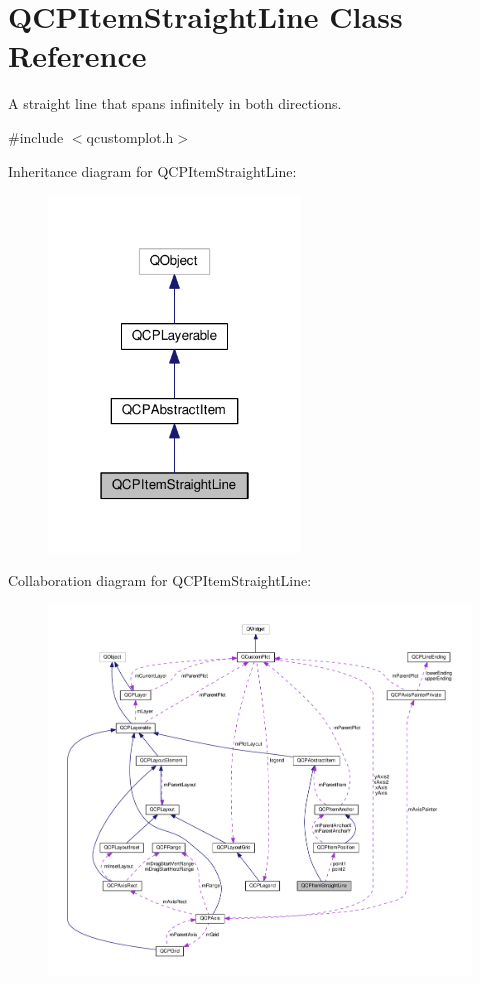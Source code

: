 \hypertarget{classQCPItemStraightLine}{}\section{Q\+C\+P\+Item\+Straight\+Line Class Reference}
\label{classQCPItemStraightLine}


A straight line that spans infinitely in both directions.  




{\ttfamily \#include $<$qcustomplot.\+h$>$}



Inheritance diagram for Q\+C\+P\+Item\+Straight\+Line\+:\nopagebreak
\begin{figure}[H]
\begin{center}
\leavevmode
\includegraphics[width=190pt]{classQCPItemStraightLine__inherit__graph}
\end{center}
\end{figure}


Collaboration diagram for Q\+C\+P\+Item\+Straight\+Line\+:\nopagebreak
\begin{figure}[H]
\begin{center}
\leavevmode
\includegraphics[width=350pt]{classQCPItemStraightLine__coll__graph}
\end{center}
\end{figure}

